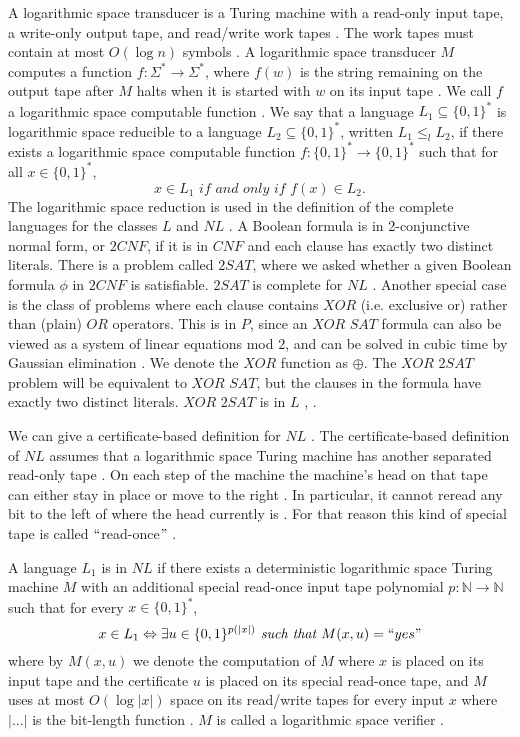 \documentclass[a4paper,UKenglish,cleveref, autoref]{lipics-v2019}
\begin{document}
A logarithmic space transducer is a Turing machine with a read-only input tape, a write-only output tape, and read/write work tapes \cite{MS06}. The work tapes must contain at most $O(\log n)$ symbols \cite{MS06}. A logarithmic space transducer $M$ computes a function $f : \Sigma^{*} \rightarrow \Sigma^{*}$, where $f(w)$ is the string remaining on the output tape after $M$ halts when it is started with $w$ on its input tape \cite{MS06}. We call $f$ a logarithmic space computable function \cite{MS06}. We say that a language $L_{1} \subseteq \{0, 1\}^{*}$ is logarithmic space reducible to a language $L_{2} \subseteq \{0, 1\}^{*}$, written $L_{1} \leq_{l} L_{2}$, if there exists a logarithmic space computable function $f : \{0, 1\}^{*} \rightarrow \{0, 1\}^{*}$ such that for all $x \in \{0, 1\}^{*}$,
\[x \in L_{1} \textit{ if and only if } f(x) \in L_{2}.\]
The logarithmic space reduction is used in the definition of the complete languages for the classes $L$ and $NL$ \cite{Pap03}. A Boolean formula is in 2-conjunctive normal form, or $2CNF$, if it is in $CNF$ and each clause has exactly two distinct literals. There is a problem called $2SAT$, where we asked whether a given Boolean formula $\phi$ in $2CNF$ is satisfiable. $2SAT$ is complete for $NL$ \cite{Pap03}. Another special case is the class of problems where each clause contains $XOR$ (i.e. exclusive or) rather than (plain) $OR$ operators. This is in $P$, since an $\textit{XOR SAT}$ formula can also be viewed as a system of linear equations mod $2$, and can be solved in cubic time by Gaussian elimination \cite{MM11}. We denote the $XOR$ function as $\oplus$. The $\textit{XOR 2SAT}$ problem will be equivalent to $\textit{XOR SAT}$, but the clauses in the formula have exactly two distinct literals. $\textit{XOR 2SAT}$ is in $L$ \cite{AR00}, \cite{RM08}.

We can give a certificate-based definition for $NL$ \cite{AB09}. The certificate-based definition of $NL$ assumes that a logarithmic space Turing machine has another separated read-only tape \cite{AB09}. On each step of the machine the machine's head on that tape can either stay in place or move to the right \cite{AB09}. In particular, it cannot reread any bit to the left of where the head currently is \cite{AB09}. For that reason this kind of special tape is called $``$read-once$"$ \cite{AB09}.

\begin{definition}
A language $L_{1}$ is in $NL$ if there exists a deterministic logarithmic space Turing machine $M$ with an additional special read-once input tape polynomial $p: \mathbb{N} \rightarrow \mathbb{N}$ such that for every $x \in \{0, 1\}^{*}$,
\[x \in L_{1} \Leftrightarrow \exists u \in \{0, 1\}^{p(|x|)} \textit{ such that } M(x, u) = ``yes" \]
where by $M(x, u)$ we denote the computation of $M$ where $x$ is placed on its input tape and the certificate $u$ is placed on its special read-once tape, and $M$ uses at most $O(\log |x|)$ space on its read/write tapes for every input $x$ where $|\ldots|$ is the bit-length function \cite{AB09}. $M$ is called a logarithmic space verifier \cite{AB09}.
\end{definition}
\end{document}

